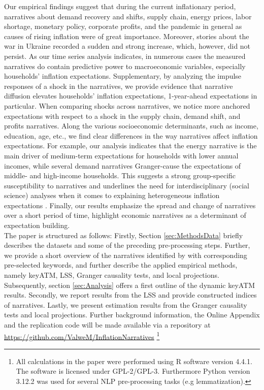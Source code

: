 Our empirical findings suggest that during the current inflationary period, narratives about demand recovery and shifts, supply chain, energy prices, labor shortage, monetary policy, corporate profits, and the pandemic in general as causes of rising inflation were of great importance. Moreover, stories about the war in Ukraine recorded a sudden and strong increase, which, however, did not persist. As our time series analysis indicates, in numerous cases the measured narratives do contain predictive power to macroeconomic variables, especially households' inflation expectations. Supplementary, by analyzing the impulse responses of a shock in the narratives, we provide evidence that narrative diffusion elevates households' inflation expectations, 1-year-ahead expectations in particular. When comparing shocks across narratives, we notice more anchored expectations with respect to a shock in the supply chain, demand shift, and profits narratives. Along the various socioeconomic determinants, such as income, education, age, etc., we find clear differences in the way narratives affect inflation expectations.  For example, our analysis indicates that the energy narrative is the main driver of medium-term expectations for households with lower annual incomes, while several demand narratives Granger-cause the expectations of middle- and high-income households. This suggests a strong group-specific susceptibility to narratives and underlines the need for interdisciplinary (social science) analyses when it comes to explaining heterogeneous inflation expectations \citep{Beckert.2016}. Finally, our results emphasize the spread and change of narratives over a short period of time, highlight economic narratives as a determinant of expectation building.\\

The paper is structured as follows: Firstly, Section \ref{sec:MethodsData} briefly describes the datasets and some of the preceding pre-processing steps. Further, we provide a short overview of the narratives identified by \cite{Andre.2023} with corresponding pre-selected keywords, and further describe the applied empirical methods, namely \textsf{keyATM}, \textsf{LSS}, Granger causality tests, and local projections. Subsequently, section \ref{sec:Analysis} offers a first outline of the dynamic \textsf{keyATM} results. Secondly, we report results from the \textsf{LSS} and provide constructed indices of narratives. Lastly, we present estimation results from the Granger causality tests and local projections. Further background information, the Online Appendix and the replication code will be made available via a repository at \url{https://github.com/ValweM/InflationNarratives} \footnote{All calculations in the paper were performed using R software \citep{R.2022} version 4.4.1. The software is licensed under GPL-2/GPL-3. Furthermore Python version 3.12.2 \citep{python.2009} was used for several NLP pre-processing tasks (e.g lemmatization).}

